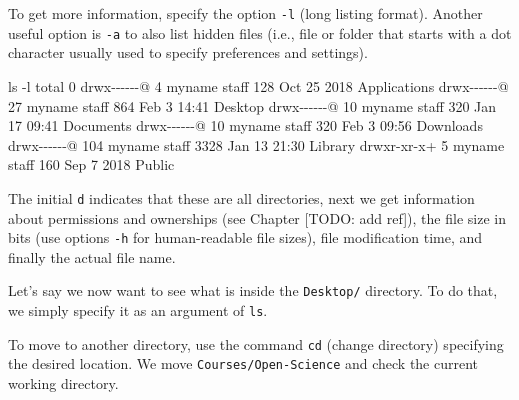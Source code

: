 \documentclass[
  11pt,
]{book}
\newenvironment{Shaded}{\begin{snugshade}}{\end{snugshade}}
\newcommand{\AttributeTok}[1]{\textcolor[rgb]{0.77,0.63,0.00}{#1}}
\newcommand{\ExtensionTok}[1]{#1}
\newcommand{\FunctionTok}[1]{\textcolor[rgb]{0.00,0.00,0.00}{#1}}
\newcommand{\NormalTok}[1]{#1}
\begin{document}
To get more information, specify the option \texttt{-l} (long listing format). Another useful option is \texttt{-a} to also list hidden files (i.e., file or folder that starts with a dot character usually used to specify preferences and settings).

\begin{Shaded}
\begin{Highlighting}[]
\FunctionTok{ls} \AttributeTok{{-}l}
\ExtensionTok{total}\NormalTok{ 0}
\ExtensionTok{drwx{-}{-}{-}{-}{-}{-}@}\NormalTok{   4 myname  staff   128 Oct 25  2018 Applications}
\ExtensionTok{drwx{-}{-}{-}{-}{-}{-}@}\NormalTok{  27 myname  staff   864 Feb  3 14:41 Desktop}
\ExtensionTok{drwx{-}{-}{-}{-}{-}{-}@}\NormalTok{  10 myname  staff   320 Jan 17 09:41 Documents}
\ExtensionTok{drwx{-}{-}{-}{-}{-}{-}@}\NormalTok{  10 myname  staff   320 Feb  3 09:56 Downloads}
\ExtensionTok{drwx{-}{-}{-}{-}{-}{-}@}\NormalTok{ 104 myname  staff  3328 Jan 13 21:30 Library}
\ExtensionTok{drwxr{-}xr{-}x+}\NormalTok{   5 myname  staff   160 Sep  7  2018 Public}
\end{Highlighting}
\end{Shaded}

The initial \texttt{d} indicates that these are all directories, next we get information about permissions and ownerships (see Chapter {[}TODO: add ref{]}), the file size in bits (use options \texttt{-h} for human-readable file sizes), file modification time, and finally the actual file name.

Let's say we now want to see what is inside the \texttt{Desktop/} directory. To do that, we simply specify it as an argument of \texttt{ls}.

\begin{Shaded}
\end{Shaded}

To move to another directory, use the command \texttt{cd} (change directory) specifying the desired location. We move \texttt{Courses/Open-Science} and check the current working directory.
\end{document}
